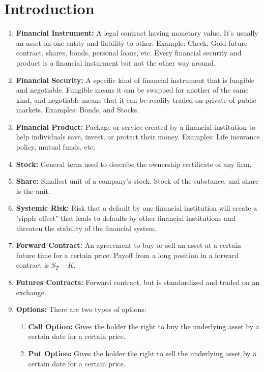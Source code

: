 
\section{Introduction}

\begin{enumerate}
    \item \textbf{Financial Instrument:} A legal contract having monetary value. It's usually an asset on one entity and liability to other. Example: Check, Gold future contract, shares, bonds, personal loans, etc.
     Every financial security and product is a financial insturment but not the other way around.
    \item \textbf{Financial Security:} A specific kind of financial instrument that is fungible and negotiable. 
    Fungible means it can be swapped for another of the same kind, and negotiable means that it can be readily traded on private of public markets.
    Examples: Bonds, and Stocks.
    \item \textbf{Financial Product:} Package or service created by a financial institution to help individuals save, invest, or protect their money.
    Examples: Life insurance policy, mutual funds, etc.
    \item \textbf{Stock:} General term used to describe the ownership certificate of any firm.
    \item \textbf{Share:} Smallest unit of a company's stock. Stock of the substance, and share is the unit. 
    \item \textbf{Systemic Risk:} Risk that a default by one financial institution will create a "ripple effect" that leads to defaults by other financial institutions and threaten the stability of the financial system.
    \item \textbf{Forward Contract:} An agreeement to buy or sell an asset at a certain future time for a certain price.
    Payoff from a long position in a forward contract is $S_T - K$.
    \item \textbf{Futures Contracts:} Forward contract, but is standardized and traded on an exchange.
    \item \textbf{Options:} There are two types of options:
    \begin{enumerate}
        \item \textbf{Call Option:} Gives the holder the right to buy the underlying asset by a certain date for a certain price.
        \item \textbf{Put Option:} Gives the holder the right to sell the underlying asset by a certain date for a certain price.

\end{enumerate}
\end{enumerate}
